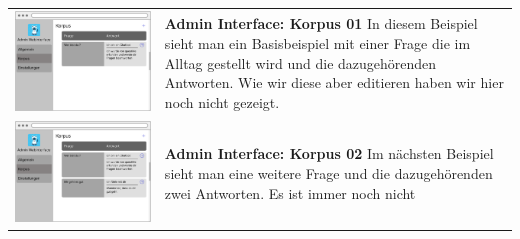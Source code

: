 \begin{tabular}{C{6cm}  L{7cm}}
    \includegraphics[width=\linewidth]{bilder/old vers. UI Design/Admin Interface I.png} & \textbf{Admin Interface: Korpus 01} \newline 
    In diesem Beispiel sieht man ein Basisbeispiel mit einer Frage die im Alltag gestellt wird und die dazugehörenden Antworten. Wie wir diese aber 
    editieren haben wir hier noch nicht gezeigt. \\
    \includegraphics[width=\linewidth]{bilder/old vers. UI Design/Admin Interface II.png} & \textbf{Admin Interface: Korpus 02} \newline 
    Im nächsten Beispiel sieht man eine weitere Frage und die dazugehörenden zwei Antworten. Es ist immer noch nicht

\end{tabular}
